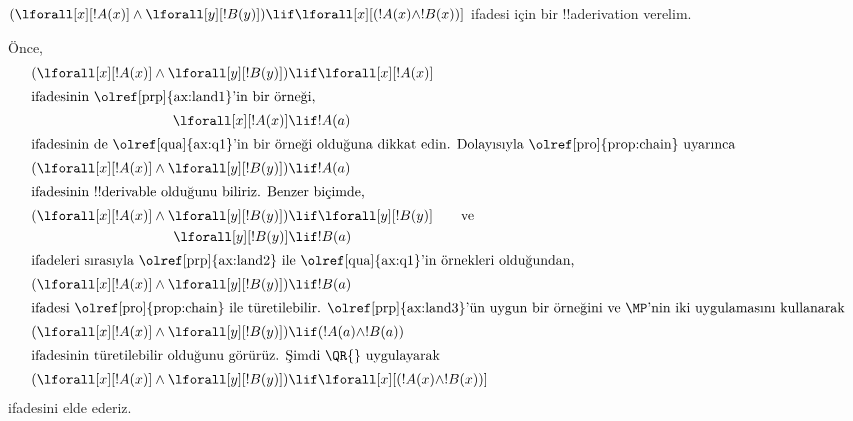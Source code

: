 \documentclass[../../../include/open-logic-section]{subfiles}
\begin{document}


\begin{ex}
$(\lforall[x][!A(x)] \land \lforall[y][!B(y)]) \lif
\lforall[x][(!A(x) \land !B(x))]$ ifadesi için bir !!a{derivation} verelim.

Önce,
\begin{align*}
  (\lforall[x][!A(x)] \land \lforall[y][!B(y)]) & \lif \lforall[x][!A(x)]
  \\
  \intertext{ifadesinin \olref[prp]{ax:land1}'in bir örneği,}
  \lforall[x][!A(x)] & \lif !A(a) \\
  \intertext{ifadesinin de \olref[qua]{ax:q1}'in bir örneği olduğuna dikkat edin. Dolayısıyla \olref[pro]{prop:chain} uyarınca}
  (\lforall[x][!A(x)] \land \lforall[y][!B(y)]) & \lif !A(a) \\
  \intertext{ifadesinin !!{derivable} olduğunu biliriz. Benzer biçimde,}
  (\lforall[x][!A(x)] \land \lforall[y][!B(y)]) & \lif \lforall[y][!B(y)] \qquad\text{ve}\\
    \lforall[y][!B(y)] & \lif !B(a)\\
    \intertext{ifadeleri sırasıyla \olref[prp]{ax:land2} ile \olref[qua]{ax:q1}'in örnekleri olduğundan,}
    (\lforall[x][!A(x)] \land \lforall[y][!B(y)]) & \lif !B(a)\\
    \intertext{ifadesi \olref[pro]{prop:chain} ile türetilebilir. \olref[prp]{ax:land3}'ün uygun bir örneğini ve \MP'nin iki uygulamasını kullanarak}
    (\lforall[x][!A(x)] \land \lforall[y][!B(y)]) & \lif (!A(a) \land !B(a))\\
    \intertext{ifadesinin türetilebilir olduğunu görürüz. Şimdi \QR{} uygulayarak}
(\lforall[x][!A(x)] \land \lforall[y][!B(y)]) & \lif \lforall[x][(!A(x) \land !B(x))]
\end{align*}
ifadesini elde ederiz.
\end{ex}
\end{document}
